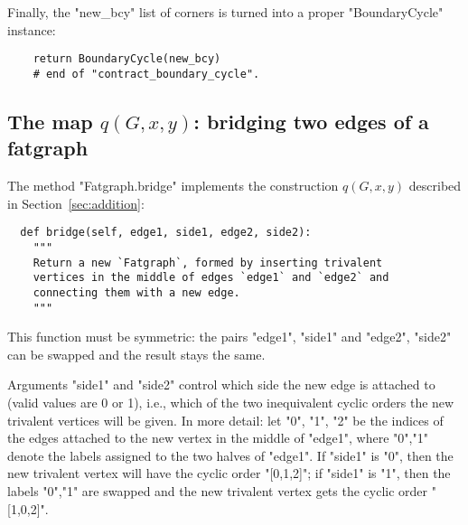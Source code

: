 Finally, the "new_bcy" list of corners is turned into a proper
"BoundaryCycle" instance:
\begin{lstlisting}
    return BoundaryCycle(new_bcy)
    # end of "contract_boundary_cycle".

\end{lstlisting}


\subsection{The map $q(G,x,y)$: bridging two edges of a fatgraph}
\label{sec:bridge}

The method "Fatgraph.bridge" implements the construction $q(G,x,y)$
described in Section~\ref{sec:addition}:
\begin{lstlisting}
  def bridge(self, edge1, side1, edge2, side2):
    """
    Return a new `Fatgraph`, formed by inserting trivalent
    vertices in the middle of edges `edge1` and `edge2` and
    connecting them with a new edge.
    """
\end{lstlisting}
This function must be symmetric: the pairs "edge1", "side1" and
"edge2", "side2" can be swapped and the result stays the same.

Arguments "side1" and "side2" control which side the new edge is
attached to (valid values are 0 or 1), i.e., which of the two
inequivalent cyclic orders the new trivalent vertices will be given.
In more detail: let "0", "1", "2" be the indices of the edges attached
to the new vertex in the middle of "edge1", where "0","1" denote the
labels assigned to the two halves of "edge1".  If "side1" is "0", then
the new trivalent vertex will have the cyclic order "[0,1,2]"; if
"side1" is "1", then the labels "0","1" are swapped and the new
trivalent vertex gets the cyclic order "[1,0,2]".

